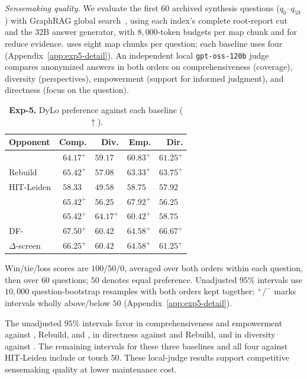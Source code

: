 \emph{Sensemaking quality.} We evaluate the first $60$ archived synthesis
questions ($q_0$--$q_{59}$)
with GraphRAG global search~\cite{edge2024graphrag}, using each index's
complete root-report cut and the 32B answer generator, with $8{,}000$-token
budgets per map chunk and for reduce evidence. \DyLo{} uses eight map
chunks per question; each baseline uses four
(Appendix~\ref{app:exp5-detail}). An independent local \texttt{gpt-oss-120b} judge
compares anonymized answers in both orders on comprehensiveness (coverage),
diversity (perspectives), empowerment (support for informed judgment), and
directness (focus on the question).

\begin{table}[tb]\centering
\caption{\textbf{Exp-5.} DyLo preference against each baseline ($\uparrow$).}
\label{tab:sensemaking-current}
\footnotesize
\setlength{\tabcolsep}{0.25em}
\begin{tabular*}{\linewidth}{@{\extracolsep{\fill}}lrrrr@{}}
\toprule
Opponent & Comp. & Div. & Emp. & Dir. \\
\midrule
\Batch{} & $64.17^{+}$ & $59.17^{\phantom{+}}$ & $60.83^{+}$ & $61.25^{+}$ \\
Rebuild & $65.42^{+}$ & $57.08^{\phantom{+}}$ & $63.33^{+}$ & $63.75^{+}$ \\
HIT-Leiden & $58.33^{\phantom{+}}$ & $49.58^{\phantom{+}}$ & $58.75^{\phantom{+}}$ & $57.92^{\phantom{+}}$ \\
\DynaMo{} & $65.42^{+}$ & $56.25^{\phantom{+}}$ & $67.92^{+}$ & $56.25^{\phantom{+}}$ \\
\QCA{} & $65.42^{+}$ & $64.17^{+}$ & $60.42^{+}$ & $58.75^{\phantom{+}}$ \\
DF-\Louvain{} & $67.50^{+}$ & $60.42^{\phantom{+}}$ & $64.58^{+}$ & $66.67^{+}$ \\
$\Delta$-screen & $66.25^{+}$ & $60.42^{\phantom{+}}$ & $64.58^{+}$ & $61.25^{+}$ \\
\bottomrule
\end{tabular*}
\par\smallskip\raggedright
Win/tie/loss scores are $100/50/0$, averaged over both orders within each
question, then over $60$ questions; $50$ denotes equal preference. Unadjusted
$95\%$ intervals use $10{,}000$ question-bootstrap resamples with both orders
kept together; $^{+}/^{-}$ marks intervals wholly above/below $50$
(Appendix~\ref{app:exp5-detail}).
\end{table}

The unadjusted $95\%$ intervals favor \DyLo{} in comprehensiveness and
empowerment against \Batch{}, Rebuild, and \QCA{}, in directness against
\Batch{} and Rebuild, and in diversity against \QCA{}. The remaining
intervals for these three baselines and all four against HIT-Leiden
include or touch $50$. These local-judge results support competitive
sensemaking quality at lower maintenance cost.
